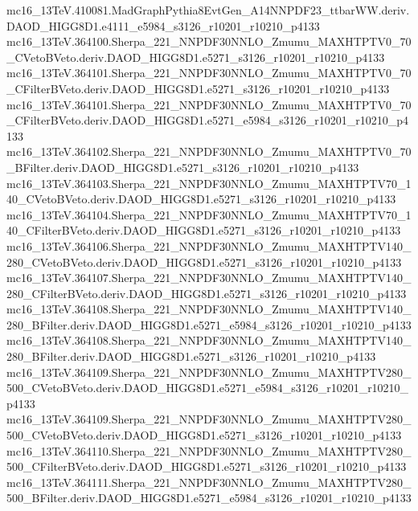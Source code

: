 \begin{footnotesize}
mc16\_13TeV.410081.MadGraphPythia8EvtGen\_A14NNPDF23\_ttbarWW.deriv.DAOD\_HIGG8D1.e4111\_e5984\_s3126\_r10201\_r10210\_p4133 \\
mc16\_13TeV.364100.Sherpa\_221\_NNPDF30NNLO\_Zmumu\_MAXHTPTV0\_70\_CVetoBVeto.deriv.DAOD\_HIGG8D1.e5271\_s3126\_r10201\_r10210\_p4133 \\
mc16\_13TeV.364101.Sherpa\_221\_NNPDF30NNLO\_Zmumu\_MAXHTPTV0\_70\_CFilterBVeto.deriv.DAOD\_HIGG8D1.e5271\_s3126\_r10201\_r10210\_p4133 \\
mc16\_13TeV.364101.Sherpa\_221\_NNPDF30NNLO\_Zmumu\_MAXHTPTV0\_70\_CFilterBVeto.deriv.DAOD\_HIGG8D1.e5271\_e5984\_s3126\_r10201\_r10210\_p4133 \\
mc16\_13TeV.364102.Sherpa\_221\_NNPDF30NNLO\_Zmumu\_MAXHTPTV0\_70\_BFilter.deriv.DAOD\_HIGG8D1.e5271\_s3126\_r10201\_r10210\_p4133 \\
mc16\_13TeV.364103.Sherpa\_221\_NNPDF30NNLO\_Zmumu\_MAXHTPTV70\_140\_CVetoBVeto.deriv.DAOD\_HIGG8D1.e5271\_s3126\_r10201\_r10210\_p4133 \\
mc16\_13TeV.364104.Sherpa\_221\_NNPDF30NNLO\_Zmumu\_MAXHTPTV70\_140\_CFilterBVeto.deriv.DAOD\_HIGG8D1.e5271\_s3126\_r10201\_r10210\_p4133 \\
mc16\_13TeV.364106.Sherpa\_221\_NNPDF30NNLO\_Zmumu\_MAXHTPTV140\_280\_CVetoBVeto.deriv.DAOD\_HIGG8D1.e5271\_s3126\_r10201\_r10210\_p4133 \\
mc16\_13TeV.364107.Sherpa\_221\_NNPDF30NNLO\_Zmumu\_MAXHTPTV140\_280\_CFilterBVeto.deriv.DAOD\_HIGG8D1.e5271\_s3126\_r10201\_r10210\_p4133 \\
mc16\_13TeV.364108.Sherpa\_221\_NNPDF30NNLO\_Zmumu\_MAXHTPTV140\_280\_BFilter.deriv.DAOD\_HIGG8D1.e5271\_e5984\_s3126\_r10201\_r10210\_p4133 \\
mc16\_13TeV.364108.Sherpa\_221\_NNPDF30NNLO\_Zmumu\_MAXHTPTV140\_280\_BFilter.deriv.DAOD\_HIGG8D1.e5271\_s3126\_r10201\_r10210\_p4133 \\
mc16\_13TeV.364109.Sherpa\_221\_NNPDF30NNLO\_Zmumu\_MAXHTPTV280\_500\_CVetoBVeto.deriv.DAOD\_HIGG8D1.e5271\_e5984\_s3126\_r10201\_r10210\_p4133 \\
mc16\_13TeV.364109.Sherpa\_221\_NNPDF30NNLO\_Zmumu\_MAXHTPTV280\_500\_CVetoBVeto.deriv.DAOD\_HIGG8D1.e5271\_s3126\_r10201\_r10210\_p4133 \\
mc16\_13TeV.364110.Sherpa\_221\_NNPDF30NNLO\_Zmumu\_MAXHTPTV280\_500\_CFilterBVeto.deriv.DAOD\_HIGG8D1.e5271\_s3126\_r10201\_r10210\_p4133 \\
mc16\_13TeV.364111.Sherpa\_221\_NNPDF30NNLO\_Zmumu\_MAXHTPTV280\_500\_BFilter.deriv.DAOD\_HIGG8D1.e5271\_e5984\_s3126\_r10201\_r10210\_p4133 \\

\end{footnotesize}
